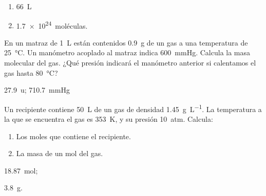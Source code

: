 \documentclass[10pt,a5paper,twoside]{article}
\begin{document}
  \begin{solution}
    \begin{enumerate}
      \item \SI{66}{\liter}
      \item \SI{1.7e24}{moléculas}.
    \end{enumerate}
  \end{solution}




  \begin{exercise}[
      tags    = {termodinámica, entalpía, entalpia de reacción, calor},
      topics  = {química, termoquímica, termodinámica},
      source  = {FQ 1B OXF 2015, p61, e24-25},
    ]
    En un matraz de \SI{1}{\liter} están contenidos \SI{0.9}{\gram} de un gas a una temperatura de \SI{25}{\celsius}. Un manómetro acoplado al matraz indica \SI{600}{\mmHg}. Calcula la masa  molecular del gas. ¿Qué presión indicará el manómetro anterior si calentamos el gas hasta \SI{80}{\celsius}?
  \end{exercise}

  \begin{solution}
    \SI{27.9}{u}; \SI{710.7}{\mmHg}
  \end{solution}



  \begin{exercise}[
      tags    = {termodinámica, entalpía, entalpia de reacción, calor},
      topics  = {química, termoquímica, termodinámica},
      source  = {FQ 1B OXF 2015, p61, e29},
    ]
    Un recipiente contiene \SI{50}{\liter} de un gas de densidad \SI{1.45}{\gram\per\liter}. La temperatura a la que se encuentra el gas es \SI{353}{\kelvin}, y su presión \SI{10}{atm}. Calcula:
    \begin{enumerate}
      \item Los moles que contiene el recipiente.
      \item La masa de un mol del gas.
    \end{enumerate}
  \end{exercise}

  \begin{solution}
    \begin{enumerate*}
      \item \SI{18.87}{\mole};
      \item \SI{3.8}{\gram}.
    \end{enumerate*}
  \end{solution}
\end{document}
